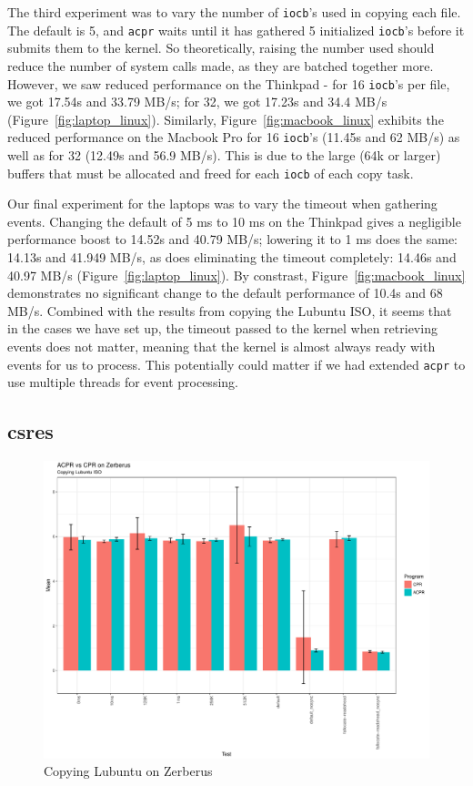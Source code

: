 \documentclass[11pt]{article}
\begin{document}
The third experiment was to vary the number of \texttt{iocb}'s used in copying
each file. The default is 5, and \texttt{acpr} waits until it has gathered 5
initialized \texttt{iocb}'s before it submits them to the kernel. So
theoretically, raising the number used should reduce the number of system calls
made, as they are batched together more. However, we saw reduced performance on
the Thinkpad - for 16 \texttt{iocb}'s per file, we got 17.54s and 33.79 MB/s;
for 32, we got 17.23s and 34.4 MB/s (Figure~\ref{fig:laptop_linux}). Similarly,
Figure~\ref{fig:macbook_linux} exhibits the reduced performance on the Macbook
Pro for 16 \texttt{iocb}'s (11.45s and 62 MB/s) as well as for 32 (12.49s and
56.9 MB/s). This is due to the large (64k or larger) buffers that must be
allocated and freed for each \texttt{iocb} of each copy task.


Our final experiment for the laptops was to vary the timeout when gathering
events. Changing the default of 5 ms to 10 ms on the Thinkpad gives a negligible
performance boost to 14.52s and 40.79 MB/s; lowering it to 1 ms does the same:
14.13s and 41.949 MB/s, as does eliminating the timeout completely: 14.46s and
40.97 MB/s (Figure~\ref{fig:laptop_linux}). By constrast,
Figure~\ref{fig:macbook_linux} demonstrates no significant change to the default
performance of 10.4s and 68 MB/s. Combined with the results from copying the
Lubuntu ISO, it seems that in the cases we have set up, the timeout passed to
the kernel when retrieving events does not matter, meaning that the kernel is
almost always ready with events for us to process. This potentially could matter
if we had extended \texttt{acpr} to use multiple threads for event processing.

\subsection{csres} \label{subsec:csres}

\begin{figure}[ht!]
        \includegraphics[width=\textwidth,]{CSRES_Lubuntu_Barplot.pdf}
        \caption{Copying Lubuntu on Zerberus}
        \label{fig:csres_lubuntu}
\end{figure}
\end{document}
